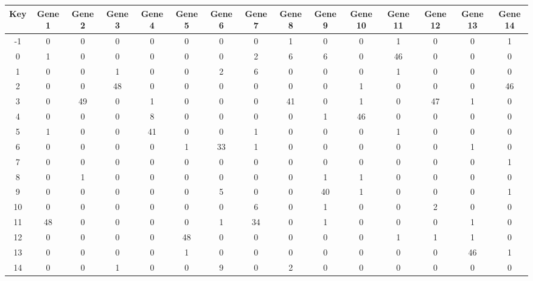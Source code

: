 \begin{tabular}{|c|c|c|c|c|c|c|c|c|c|c|c|c|c|c|}
\hline
Key & Gene 1 & Gene 2 & Gene 3 & Gene 4 & Gene 5 & Gene 6 & Gene 7 & Gene 8 & Gene 9 & Gene 10 & Gene 11 & Gene 12 & Gene 13 & Gene 14 \\
\hline
-1 & 0 & 0 & 0 & 0 & 0 & 0 & 0 & 1 & 0 & 0 & 1 & 0 & 0 & 1 \\
0 & 1 & 0 & 0 & 0 & 0 & 0 & 2 & 6 & 6 & 0 & 46 & 0 & 0 & 0 \\
1 & 0 & 0 & 1 & 0 & 0 & 2 & 6 & 0 & 0 & 0 & 1 & 0 & 0 & 0 \\
2 & 0 & 0 & 48 & 0 & 0 & 0 & 0 & 0 & 0 & 1 & 0 & 0 & 0 & 46 \\
3 & 0 & 49 & 0 & 1 & 0 & 0 & 0 & 41 & 0 & 1 & 0 & 47 & 1 & 0 \\
4 & 0 & 0 & 0 & 8 & 0 & 0 & 0 & 0 & 1 & 46 & 0 & 0 & 0 & 0 \\
5 & 1 & 0 & 0 & 41 & 0 & 0 & 1 & 0 & 0 & 0 & 1 & 0 & 0 & 0 \\
6 & 0 & 0 & 0 & 0 & 1 & 33 & 1 & 0 & 0 & 0 & 0 & 0 & 1 & 0 \\
7 & 0 & 0 & 0 & 0 & 0 & 0 & 0 & 0 & 0 & 0 & 0 & 0 & 0 & 1 \\
8 & 0 & 1 & 0 & 0 & 0 & 0 & 0 & 0 & 1 & 1 & 0 & 0 & 0 & 0 \\
9 & 0 & 0 & 0 & 0 & 0 & 5 & 0 & 0 & 40 & 1 & 0 & 0 & 0 & 1 \\
10 & 0 & 0 & 0 & 0 & 0 & 0 & 6 & 0 & 1 & 0 & 0 & 2 & 0 & 0 \\
11 & 48 & 0 & 0 & 0 & 0 & 1 & 34 & 0 & 1 & 0 & 0 & 0 & 1 & 0 \\
12 & 0 & 0 & 0 & 0 & 48 & 0 & 0 & 0 & 0 & 0 & 1 & 1 & 1 & 0 \\
13 & 0 & 0 & 0 & 0 & 1 & 0 & 0 & 0 & 0 & 0 & 0 & 0 & 46 & 1 \\
14 & 0 & 0 & 1 & 0 & 0 & 9 & 0 & 2 & 0 & 0 & 0 & 0 & 0 & 0 \\
\hline
\end{tabular}
